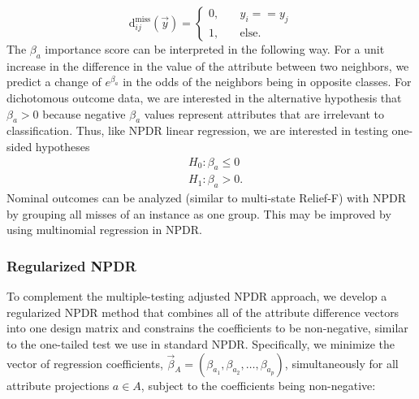 \documentclass[10pt]{article}
\begin{document}
\begin{equation}\label{eq:hitdiff}
\text{d}^{\text{miss}}_{ij}(\vec{y}) = \left\{
    \begin{array}{ll}
        0, & \quad  y_{i} == y_{j} \\
        1, & \quad \text{else}.
    \end{array}
\right.
\end{equation}
The $\beta_a$ importance score can be interpreted in the following way.
For a unit increase in the difference in the value of the attribute between two neighbors, we predict a change of $e^{\beta_a}$ in the odds of the neighbors being in opposite classes.
For dichotomous outcome data, we are interested in the alternative hypothesis that $\beta_a>0$ because negative $\beta_a$ values represent attributes that are irrelevant to classification.
Thus, like NPDR linear regression, we are interested in testing one-sided hypotheses
\begin{equation}
\begin{aligned}
    & H_0: \beta_a \le 0 \\
    & H_1: \beta_a > 0.
\end{aligned}
\end{equation}
Nominal outcomes can be analyzed (similar to multi-state Relief-F) with NPDR by grouping all misses of an instance as one group.
This may be improved by using multinomial regression in NPDR.

\subsubsection{Regularized NPDR}

To complement the multiple-testing adjusted NPDR approach, we develop a regularized NPDR method that combines all of the attribute difference vectors into one design matrix and constrains the coefficients to be non-negative, similar to the one-tailed test we use in standard NPDR.
Specifically, we minimize the vector of regression coefficients, $\vec{\beta}_A = (\beta_{a_1}, \beta_{a_2}, \ldots, \beta_{a_p})$, simultaneously for all attribute projections $a \in A$, subject to the coefficients being non-negative: 
\end{document}
